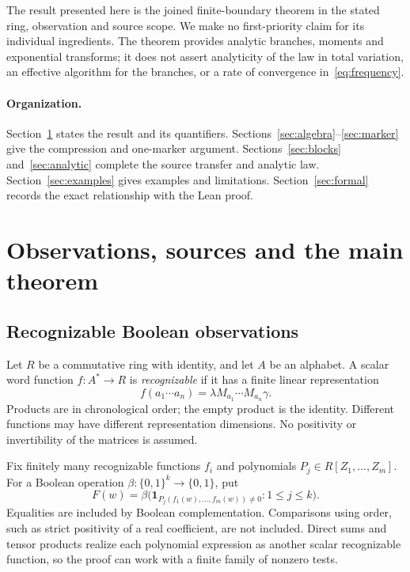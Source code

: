 \documentclass[11pt]{article}
\theoremstyle{definition}
\theoremstyle{remark}
\newcommand{\one}{\mathbf 1}
\begin{document}
The result presented here is the joined finite-boundary theorem in the stated ring, observation and source scope. We make no first-priority claim for its individual ingredients. The theorem provides analytic branches, moments and exponential transforms; it does not assert analyticity of the law in total variation, an effective algorithm for the branches, or a rate of convergence in~\eqref{eq:frequency}.

\paragraph{Organization.}
Section~\ref{sec:main} states the result and its quantifiers. Sections~\ref{sec:algebra}--\ref{sec:marker} give the compression and one-marker argument. Sections~\ref{sec:blocks} and~\ref{sec:analytic} complete the source transfer and analytic law. Section~\ref{sec:examples} gives examples and limitations. Section~\ref{sec:formal} records the exact relationship with the Lean proof.

\section{Observations, sources and the main theorem}\label{sec:main}
\subsection{Recognizable Boolean observations}
Let $R$ be a commutative ring with identity, and let $A$ be an alphabet. A scalar word function $f:A^*\to R$ is \emph{recognizable} if it has a finite linear representation
\[
 f(a_1\cdots a_n)=\lambda M_{a_1}\cdots M_{a_n}\gamma.
\]
Products are in chronological order; the empty product is the identity. Different functions may have different representation dimensions. No positivity or invertibility of the matrices is assumed.

Fix finitely many recognizable functions $f_i$ and polynomials $P_j\in R[Z_1,\ldots,Z_m]$. For a Boolean operation $\beta:\{0,1\}^k\to\{0,1\}$, put
\begin{equation}\label{eq:event}
 F(w)=\beta\bigl(\one_{P_j(f_1(w),\ldots,f_m(w))\ne0}:1\leq j\leq k\bigr).
\end{equation}
Equalities are included by Boolean complementation. Comparisons using order, such as strict positivity of a real coefficient, are not included. Direct sums and tensor products realize each polynomial expression as another scalar recognizable function, so the proof can work with a finite family of nonzero tests.
\end{document}
